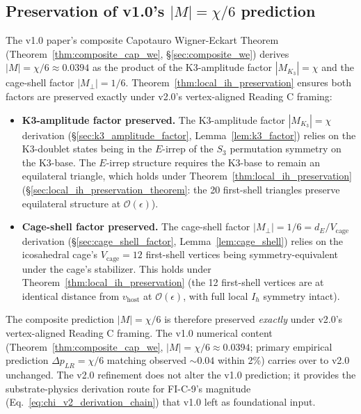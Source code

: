 \documentclass[11pt,letterpaper]{article}
\newcommand{\Kthree}{\ensuremath{K_3}}
\newcommand{\DeltapLR}{\Delta p_{LR}}
\newcommand{\Sthree}{S_3}
\begin{document}
\subsection{Preservation of v1.0's $|M| = \chi/6$ prediction}\label{sec:v1_preservation_under_reading_c}

The v1.0 paper's composite Capotauro Wigner-Eckart Theorem (Theorem~\ref{thm:composite_cap_we}, \S\ref{sec:composite_we}) derives $|M| = \chi/6 \approx 0.0394$ as the product of the K3-amplitude factor $|M_{\Kthree}| = \chi$ and the cage-shell factor $|M_\perp| = 1/6$. Theorem~\ref{thm:local_ih_preservation} ensures both factors are preserved exactly under v2.0's vertex-aligned Reading C framing:

\begin{itemize}\setlength\itemsep{0.2em}
    \item \textbf{K3-amplitude factor preserved.} The K3-amplitude factor $|M_{\Kthree}| = \chi$ derivation (\S\ref{sec:k3_amplitude_factor}, Lemma~\ref{lem:k3_factor}) relies on the K3-doublet states being in the $E$-irrep of the $\Sthree$ permutation symmetry on the K3-base. The $E$-irrep structure requires the K3-base to remain an equilateral triangle, which holds under Theorem~\ref{thm:local_ih_preservation} (\S\ref{sec:local_ih_preservation_theorem}: the 20 first-shell triangles preserve equilateral structure at $\mathcal{O}(\epsilon)$).
    \item \textbf{Cage-shell factor preserved.} The cage-shell factor $|M_\perp| = 1/6 = d_E / V_{\text{cage}}$ derivation (\S\ref{sec:cage_shell_factor}, Lemma~\ref{lem:cage_shell}) relies on the icosahedral cage's $V_{\text{cage}} = 12$ first-shell vertices being symmetry-equivalent under the cage's stabilizer. This holds under Theorem~\ref{thm:local_ih_preservation} (the 12 first-shell vertices are at identical distance from $v_{\text{host}}$ at $\mathcal{O}(\epsilon)$, with full local $I_h$ symmetry intact).
\end{itemize}

The composite prediction $|M| = \chi/6$ is therefore preserved \emph{exactly} under v2.0's vertex-aligned Reading C framing. The v1.0 numerical content (Theorem~\ref{thm:composite_cap_we}, $|M| = \chi/6 \approx 0.0394$; primary empirical prediction $\DeltapLR = \chi/6$ matching observed $\sim 0.04$ within 2\%) carries over to v2.0 unchanged. The v2.0 refinement does not alter the v1.0 prediction; it provides the substrate-physics derivation route for FI-C-9's magnitude (Eq.~\eqref{eq:chi_v2_derivation_chain}) that v1.0 left as foundational input.
\end{document}
